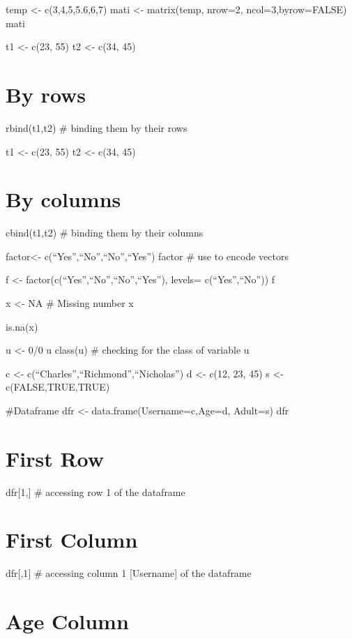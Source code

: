 \documentclass[
]{article}
\begin{document}
temp \textless- c(3,4,5,5.6,6,7) mati \textless- matrix(temp, nrow=2,
ncol=3,byrow=FALSE) mati

t1 \textless- c(23, 55) t2 \textless- c(34, 45)

\section{By rows}\label{by-rows}

rbind(t1,t2) \# binding them by their rows

t1 \textless- c(23, 55) t2 \textless- c(34, 45)

\section{By columns}\label{by-columns}

cbind(t1,t2) \# binding them by their columns

factor\textless- c(``Yes'',``No'',``No'',``Yes'') factor \# use to
encode vectors

f \textless- factor(c(``Yes'',``No'',``No'',``Yes''), levels=
c(``Yes'',``No'')) f

x \textless- NA \# Missing number x

is.na(x)

u \textless- 0/0 u class(u) \# checking for the class of variable u

c \textless- c(``Charles'',``Richmond'',``Nicholas'') d \textless- c(12,
23, 45) s \textless- c(FALSE,TRUE,TRUE)

\#Dataframe dfr \textless- data.frame(Username=c,Age=d, Adult=s) dfr

\section{First Row}\label{first-row}

dfr{[}1,{]} \# accessing row 1 of the dataframe

\section{First Column}\label{first-column}

dfr{[},1{]} \# accessing column 1 {[}Username{]} of the dataframe

\section{Age Column}\label{age-column}
\end{document}
